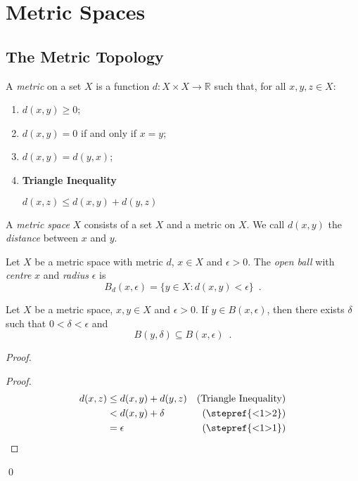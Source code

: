 \chapter{Metric Spaces}

\section{The Metric Topology}

\begin{df}[Metric]
  A \emph{metric} on a set $X$ is a function $d : X \times X \rightarrow
  \mathbb{R}$ such that, for all $x, y, z \in X$:
  \begin{enumerate}
    \item $d(x, y) \geq 0$;
    \item $d(x, y) = 0$ if and only if $x = y$;
    \item $d(x, y) = d(y, x)$;
    \item \textbf{Triangle Inequality}

    $d(x, z) \leq d(x, y) + d(y, z)$
  \end{enumerate}
  A \emph{metric space} $X$ consists of a set $X$ and a metric on $X$. We
  call $d(x, y)$ the \emph{distance} between $x$ and $y$.
\end{df}

\begin{df}
  Let $X$ be a metric space with metric $d$, $x \in X$ and $\epsilon > 0$.
  The \emph{open       ball} with \emph{centre} $x$ and \emph{radius}
  $\epsilon$
  is
  \[ B_d(x, \epsilon) = \{ y \in X : d(x, y) < \epsilon \} \enspace . \]
\end{df}

\begin{lm}
  \label{lm:topology:metric:balls}
  Let $X$ be a metric space, $x, y \in X$ and $\epsilon > 0$. If $y \in B(x,
  \epsilon)$, then there exists $\delta$ such that $0 < \delta < \epsilon$ and
  \[ B(y, \delta) \subseteq B(x, \epsilon) \enspace . \]
\end{lm}

\begin{proof}
  \pf
  \begin{proof}
    \pf
    \begin{align*}
      d(x, z) & \leq d(x, y) + d(y, z) & (\text{Triangle Inequality}) \\
      & < d(x, y) + \delta & (\text{\stepref{<1>2}}) \\
      & = \epsilon & (\text{\stepref{<1>1}})
    \end{align*}
  \end{proof}
  \qed
\end{proof}

